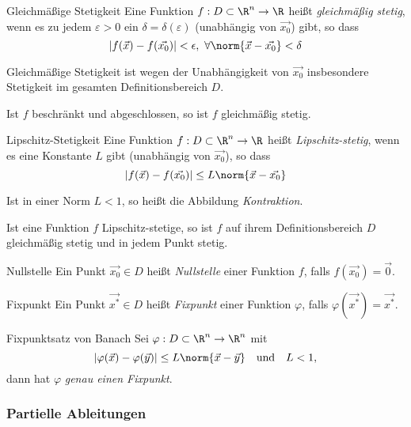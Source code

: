 \documentclass[german]{../spicker}
\renewcommand{\abs}[1]{\left| #1 \right|}
\begin{document}
\begin{defi}{Gleichmäßige Stetigkeit}
    Eine Funktion $f: D \subset \R^n \to \R$ heißt \emph{gleichmäßig stetig}, wenn es zu jedem $\varepsilon > 0$ ein $\delta = \delta(\varepsilon)$ (unabhängig von $\vec{x_0}$) gibt, so dass
    $$
        \abs{f(\vec{x}) - f(\vec{x_0})} < \epsilon, \ \forall \norm{\vec{x} - \vec{x_0}} < \delta
    $$

    Gleichmäßige Stetigkeit ist wegen der Unabhängigkeit von $\vec{x_0}$ insbesondere Stetigkeit im gesamten Definitionsbereich $D$.

    Ist $f$ beschränkt und abgeschlossen, so ist $f$ gleichmäßig stetig.
\end{defi}

\begin{defi}{Lipschitz-Stetigkeit}
    Eine Funktion $f : D \subset \R^n \to \R$ heißt \emph{Lipschitz-stetig}, wenn es eine Konstante $L$ gibt (unabhängig von $\vec{x_0}$), so dass
    $$
        \abs{f(\vec{x}) - f(\vec{x_0})} \leq L \norm{\vec{x} - \vec{x_0}}
    $$

    Ist in einer Norm $L < 1$, so heißt die Abbildung \emph{Kontraktion}.

    Ist eine Funktion $f$ Lipschitz-stetige, so ist $f$ auf ihrem Definitionsbereich $D$ gleichmäßig stetig und in jedem Punkt stetig.
\end{defi}

\begin{bonus}{Nullstelle}
    Ein Punkt $\vec{x_0} \in D$ heißt \emph{Nullstelle} einer Funktion $f$, falls $f(\vec{x_0}) = \vec{0}$.
\end{bonus}

\begin{defi}{Fixpunkt}
    Ein Punkt $\vec{x^*}\in D$ heißt \emph{Fixpunkt} einer Funktion $\varphi$, falls $\varphi(\vec{x^*}) = \vec{x^*}$.
\end{defi}

\begin{defi}{Fixpunktsatz von Banach}
    Sei $\varphi : D \subset \R^n \to \R^n$ mit
    $$
        \abs{\varphi(\vec{x}) - \varphi(\vec{y})} \leq L \norm{\vec{x} - \vec{y}} \quad \text{und} \quad L < 1,
    $$
    dann hat $\varphi$ \emph{genau einen Fixpunkt}.
\end{defi}

\subsubsection{Partielle Ableitungen}
\end{document}
